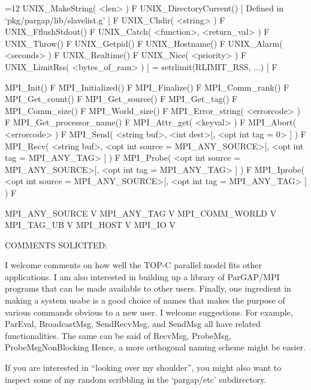 %

{=12
\>UNIX_MakeString( <len> ) F
\>UNIX_DirectoryCurrent() [ Defined in `pkg/pargap/lib/slavelist.g' ] F
\>UNIX_Chdir( <string> ) F
\>UNIX_FflushStdout() F
\>UNIX_Catch( <function>, <return_val> ) F
\>UNIX_Throw() F
\>UNIX_Getpid() F
\>UNIX_Hostname() F
\>UNIX_Alarm( <seconds> ) F
\>UNIX_Realtime() F
\>UNIX_Nice( <priority> ) F
\>UNIX_LimitRss( <bytes_of_ram> ) [ = setrlimit(RLIMIT_RSS, ...) ] F

%

\>MPI_Init() F
\>MPI_Initialized() F
\>MPI_Finalize() F
\>MPI_Comm_rank() F
\>MPI_Get_count() F
\>MPI_Get_source() F
\>MPI_Get_tag() F
\>MPI_Comm_size() F
\>MPI_World_size() F
\>MPI_Error_string( <errorcode> ) F
\>MPI_Get_processor_name() F
\>MPI_Attr_get( <keyval> ) F
\>MPI_Abort( <errorcode> ) F
\>MPI_Send( <string buf>, <int dest>[, <opt int tag = 0> ] ) F
\>MPI_Recv( <string buf>, <opt int source = MPI_ANY_SOURCE>[, <opt int tag = MPI_ANY_TAG> ] ) F
\>MPI_Probe( <opt int source = MPI_ANY_SOURCE>[, <opt int tag = MPI_ANY_TAG> ] ) F
\>MPI_Iprobe( <opt int source = MPI_ANY_SOURCE>[, <opt int tag = MPI_ANY_TAG> ] ) F

%

\>MPI_ANY_SOURCE V
\>MPI_ANY_TAG V
\>MPI_COMM_WORLD V
\>MPI_TAG_UB V
\>MPI_HOST V
\>MPI_IO V
\par}



COMMENTS SOLICITED:

I welcome comments on how well the TOP-C parallel model fits other
applications.  I am also interested in building up a library of
ParGAP/MPI programs that can be made available to other users.
Finally, one ingredient in making a system usabe is a good choice of
names that makes the purpose of various commands obvious to a new
user.  I welcome suggestions.  For example, ParEval, BroadcastMsg,
SendRecvMsg, and SendMsg all have related functionalities.  The same
can be said of RecvMsg, ProbeMsg, ProbeMsgNonBlocking Hence, a more
orthogonal naming scheme might be easier.

If you are interested in ``looking over my shoulder'', you might also
want to inspect some of my random scribbling in the `pargap/etc'
subdirectory.


